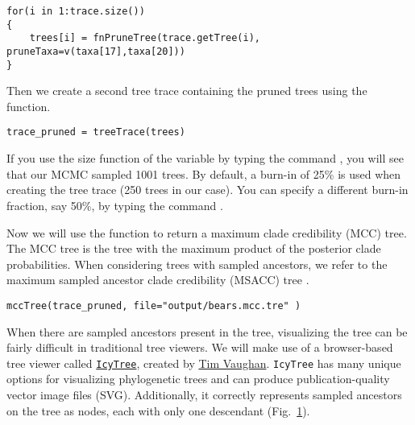 {\tt \begin{snugshade*}
\begin{lstlisting}
for(i in 1:trace.size())
{
    trees[i] = fnPruneTree(trace.getTree(i), pruneTaxa=v(taxa[17],taxa[20]))
}
\end{lstlisting}
\end{snugshade*}}

Then we create a second tree trace containing the pruned trees using the  function.

{\tt \begin{snugshade*}
\begin{lstlisting}
trace_pruned = treeTrace(trees)
\end{lstlisting}
\end{snugshade*}}

If you use the size function of the  variable by typing the command \colorbox{shadecolor}{}, you will see that our MCMC sampled 1001 trees. 
By default, a burn-in of 25\% is used when creating the tree trace (250 trees in our case). You can specify a different burn-in fraction, say 50\%, by typing the command \colorbox{shadecolor}{}.

Now we will use the  function to return a maximum clade credibility (MCC) tree.
The MCC tree is the tree with the maximum product of the posterior clade probabilities.
When considering trees with sampled ancestors, we refer to the maximum sampled ancestor clade credibility (MSACC) tree \citep{Gavryushkina2016}.
{\tt \begin{snugshade*}
\begin{lstlisting}
mccTree(trace_pruned, file="output/bears.mcc.tre" )
\end{lstlisting}
\end{snugshade*}}


When there are sampled ancestors present in the tree, visualizing the tree can be fairly difficult in traditional tree viewers.
We will make use of a browser-based tree viewer called \href{http://tgvaughan.github.io/icytree/}{\tt IcyTree}, created by \href{https://github.com/tgvaughan}{Tim Vaughan}.
{\tt IcyTree} has many unique options for visualizing phylogenetic trees and can produce publication-quality vector image files (\IE SVG). 
Additionally, it correctly represents sampled ancestors on the tree as nodes, each with only one descendant (Fig.\ \ref{fig:IcyTreeSumm}). 
\begin{figure}[h!]
\label{fig:IcyTreeSumm}
\end{figure}


